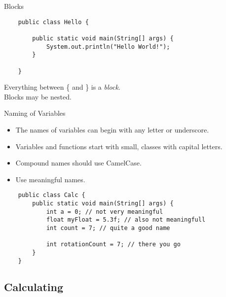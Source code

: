 \begin{frame}[fragile]{Blocks}
    \begin{lstlisting}
    public class Hello {
    
        public static void main(String[] args) {
            System.out.println("Hello World!");
        }
        
    }\end{lstlisting}
    Everything between \{ and \} is a \emph{block}. \\
    Blocks may be nested.
\end{frame}

\begin{frame}[fragile]{Naming of Variables}
    \begin{itemize}
        \item The names of variables can begin with any letter or underscore. \\
        \item Variables and functions start with small, classes with capital letters.
        \item Compound names should use CamelCase.
        \item Use meaningful names.
    \end{itemize}
    \begin{lstlisting}
    public class Calc {
        public static void main(String[] args) {
            int a = 0; // not very meaningful
            float myFloat = 5.3f; // also not meaningfull
            int count = 7; // quite a good name

            int rotationCount = 7; // there you go
        }
    }\end{lstlisting}
\end{frame}

\subsection{Calculating}

